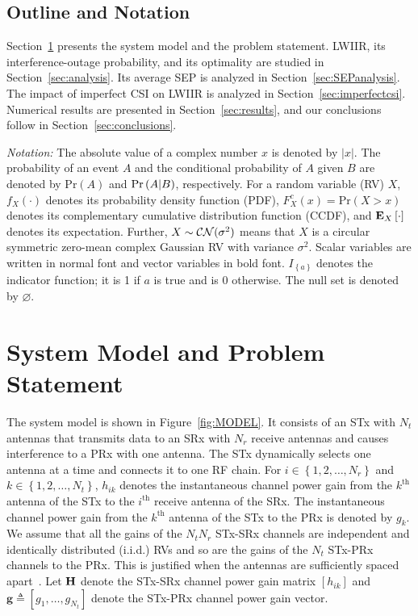 \documentclass[journal]{IEEEtran}
\newcommand{\brac}[1]{\left({#1}\right)}
\newcommand{\cbrac}[1]{\left\{{#1}\right\}}
\newcommand{\indic}[1]{I_{\cbrac{#1}}}
\newcommand{\define}{\triangleq}
\newcommand{\mtx}[1]{{\bf #1}} %
\newcommand{\explow}[2]{{\bf{E}}_{#1}\left[{#2}\right]}
\newcommand{\prob}[1]{\text{Pr}\brac{#1}}
\newcommand{\given}{\arrowvert}
\newcommand{\Nt}{{N_t}}
\newcommand{\Nr}{{N_r}}
\newcommand{\such}{h}
\newcommand{\puch}{g}
\newcommand{\hk}[1]{{\such_{#1}}}
\newcommand{\gk}[1]{{\puch_{#1}}}
\newcommand{\g}{\mathbf{\puch}}
\newcommand{\antopts}{\left\{1,2,\ldots,\Nt\right\}}
\newcommand{\nropts}{\left\{1,2,\ldots,\Nr\right\}}
\newcommand{\Hmx}{\mtx{H}}
\newcommand{\ith}{i^{\text{th}}}
\newcommand{\kth}{k^{\text{th}}}
\newcommand{\nullset}{\varnothing}
\begin{document}
\subsection{Outline and Notation}
Section~\ref{sec:model} presents the system model and the problem statement. LWIIR, its interference-outage probability, and its optimality are studied in Section~\ref{sec:analysis}. Its average SEP is analyzed in Section~\ref{sec:SEPanalysis}. The impact of imperfect CSI on LWIIR  is analyzed in Section~\ref{sec:imperfectcsi}. Numerical results are presented in Section~\ref{sec:results}, and our conclusions follow in Section~\ref{sec:conclusions}. 

\emph{Notation:} The absolute value of a complex number $x$ is denoted by $|x|$. The probability of an event $A$ and the conditional probability of $A$ given $B$ are denoted by $\prob{A}$ and $\prob{A \given B}$, respectively. For a random variable (RV) $X$, $f_{X}(\cdot)$ denotes its probability density function (PDF), $F_{X}^{c}(x)=\prob{X>x}$ denotes its complementary cumulative distribution function (CCDF), and $\explow{X}{\cdot}$ denotes its expectation. Further, $X \sim {\cal CN}(\sigma^2)$ means that $X$ is a circular symmetric zero-mean complex Gaussian RV with  variance $\sigma^2$.  Scalar variables are written in normal font and vector variables in bold font. $\indic{a}$ denotes the indicator function; it is 1 if $a$ is true and is 0 otherwise. The null set is denoted by $\nullset$.

\section{System Model and Problem Statement}
\label{sec:model}
The system model is shown in Figure~\ref{fig:MODEL}. It consists of an STx with $\Nt$ antennas that transmits data to an SRx with $\Nr$ receive antennas and causes interference to a PRx with one antenna. The STx dynamically selects one antenna at a time and connects it to one RF chain. For $i \in \nropts$ and $k \in \antopts$, $\hk{ik}$ denotes the instantaneous channel power gain from the $\kth$ antenna of the STx to the $\ith$ receive antenna of the SRx. The instantaneous channel power gain from the $\kth$ antenna of the STx to the PRx is denoted by $\gk{k}$. We assume that all the gains of the $\Nt\Nr$ STx-SRx channels are independent and identically distributed (i.i.d.) RVs and so are the gains of the $\Nt$ STx-PRx channels to the PRx. This is justified when the antennas are sufficiently spaced apart~\cite{Fakhan_2014_TSP,Kong_2011_JCN,Sarvendranath_2013_TCOM,Hanif_2015_globecom}. Let $\Hmx$ denote the STx-SRx channel power gain matrix $\left[\hk{ik}\right]$ and $\g\define\left[\gk{1},\ldots,\gk{\Nt}\right]$ denote the STx-PRx channel power gain vector.
\end{document}
